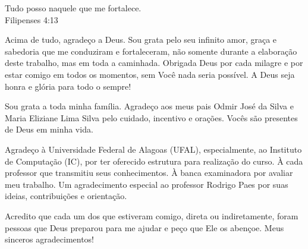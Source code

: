\documentclass{ppgi}
\begin{document}
\imprimircapa
\imprimirfolhaderosto

\begin{dedicatoria}
\prededicatoria

\begin{flushright}
Tudo posso naquele que me fortalece.\\
Filipenses 4:13
\end{flushright}

\end{dedicatoria}

\begin{agradecimentos}

Acima de tudo, agradeço a Deus. Sou grata pelo seu infinito amor, graça e sabedoria que me conduziram e fortaleceram, não somente durante a elaboração deste trabalho, mas em toda a caminhada. Obrigada Deus por cada milagre e por estar comigo em todos os momentos, sem Você nada seria possível. A Deus seja honra e glória para todo o sempre!

Sou grata a toda minha família. Agradeço aos meus pais Odmir José da Silva e Maria Eliziane Lima Silva pelo cuidado, incentivo e orações. Vocês são presentes de Deus em minha vida. 

Agradeço à Universidade Federal de Alagoas (UFAL), especialmente, ao Instituto de Computação (IC), por ter oferecido estrutura para realização do curso. À cada professor que transmitiu seus conhecimentos. À banca examinadora por avaliar meu trabalho. Um agradecimento especial ao professor Rodrigo Paes por suas ideias, contribuições e orientação.

Acredito que cada um dos que estiveram comigo, direta ou indiretamente, foram pessoas que Deus preparou para me ajudar e peço que Ele os abençoe.
Meus sinceros agradecimentos!

\end{agradecimentos}
\end{document}
